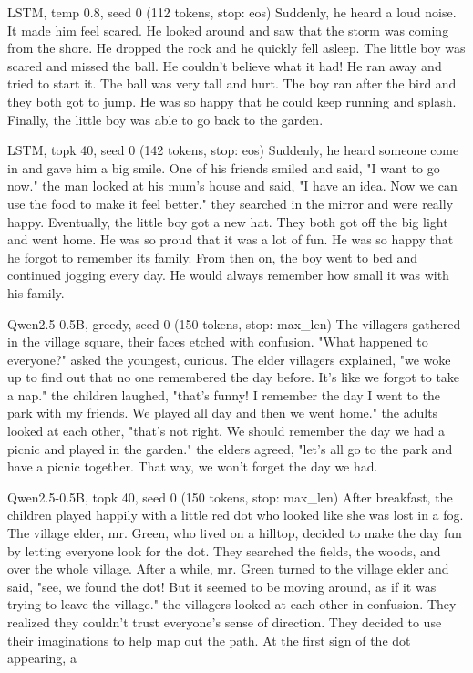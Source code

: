 \begin{modelout}{LSTM, temp 0.8, seed 0 (112 tokens, stop: eos)}
\small Suddenly, he heard a loud noise. It made him feel scared. He looked around and saw that the storm was coming from the shore. He dropped the rock and he quickly fell asleep. The little boy was scared and missed the ball. He couldn't believe what it had! He ran away and tried to start it. The ball was very tall and hurt. The boy ran after the bird and they both got to jump. He was so happy that he could keep running and splash. Finally, the little boy was able to go back to the garden.
\end{modelout}

\begin{modelout}{LSTM, topk 40, seed 0 (142 tokens, stop: eos)}
\small Suddenly, he heard someone come in and gave him a big smile. One of his friends smiled and said, "I want to go now." the man looked at his mum's house and said, "I have an idea. Now we can use the food to make it feel better." they searched in the mirror and were really happy. Eventually, the little boy got a new hat. They both got off the big light and went home. He was so proud that it was a lot of fun. He was so happy that he forgot to remember its family. From then on, the boy went to bed and continued jogging every day. He would always remember how small it was with his family.
\end{modelout}

\begin{modelout}{Qwen2.5-0.5B, greedy, seed 0 (150 tokens, stop: max\_len)}
\small The villagers gathered in the village square, their faces etched with confusion. "What happened to everyone?" asked the youngest, curious. The elder villagers explained, "we woke up to find out that no one remembered the day before. It's like we forgot to take a nap." the children laughed, "that's funny! I remember the day I went to the park with my friends. We played all day and then we went home." the adults looked at each other, "that's not right. We should remember the day we had a picnic and played in the garden." the elders agreed, "let's all go to the park and have a picnic together. That way, we won't forget the day we had.
\end{modelout}


\begin{modelout}{Qwen2.5-0.5B, topk 40, seed 0 (150 tokens, stop: max\_len)}
\small After breakfast, the children played happily with a little red dot who looked like she was lost in a fog. The village elder, mr. Green, who lived on a hilltop, decided to make the day fun by letting everyone look for the dot. They searched the fields, the woods, and over the whole village. After a while, mr. Green turned to the village elder and said, "see, we found the dot! But it seemed to be moving around, as if it was trying to leave the village." the villagers looked at each other in confusion. They realized they couldn't trust everyone's sense of direction. They decided to use their imaginations to help map out the path. At the first sign of the dot appearing, a
\end{modelout}


